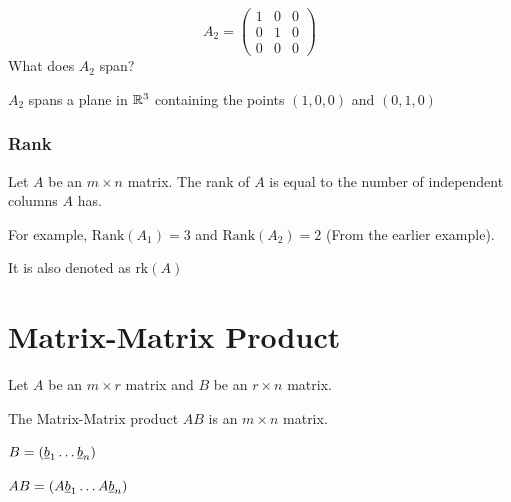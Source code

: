 \begin{example}
    \[
        A_2 = \begin{pmatrix}
            1 & 0 & 0 \\ 0 & 1 & 0 \\ 0 & 0 & 0
        \end{pmatrix}
    \]
    What does $A_2$ span? 
    
    $A_2$ spans a plane in $\mathbb{R}^3$ containing the points $(1, 0, 0)$ and $(0, 1, 0)$
    
\end{example}


\subsubsection{Rank}
\begin{definition}
    Let $A$ be an $m \times n$ matrix. The rank of $A$ is equal to the number of independent columns $A$ has.

    For example, $\text{Rank}(A_1) = 3$ and $\text{Rank}(A_2) = 2$ (From the earlier example). 

    It is also denoted as $\text{rk}(A)$
\end{definition}


\newpage

\section{Matrix-Matrix Product}

\begin{definition}
    Let $A$ be an $m \times r$ matrix and $B$ be an $r \times n$ matrix. 
    
    The Matrix-Matrix product $AB$ is an $m \times n$ matrix. 
    
    $B = (\underline{b}_1 \hdots \underline{b}_n)$

    $AB = (A\underline{b}_1 \hdots A\underline{b}_n)$
\end{definition}

